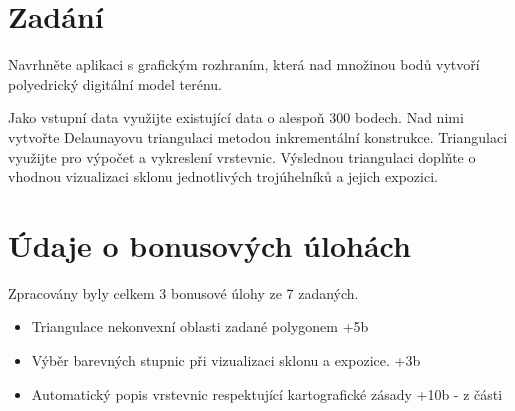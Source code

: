 \documentclass[11pt]{article}
\begin{document}



\tableofcontents

\clearpage


\section{Zadání}
Navrhněte aplikaci s grafickým rozhraním, která nad množinou bodů vytvoří polyedrický digitální model terénu.

Jako vstupní data využijte existující data o alespoň 300 bodech. Nad nimi vytvořte Delaunayovu triangulaci metodou inkrementální konstrukce. Triangulaci využijte pro výpočet a vykreslení vrstevnic. Výslednou triangulaci doplňte o vhodnou vizualizaci sklonu jednotlivých trojúhelníků a jejich expozici. 


\section{Údaje o bonusových úlohách}
Zpracovány byly celkem 3 bonusové úlohy ze 7 zadaných.

\begin{itemize}
	\item Triangulace nekonvexní oblasti zadané polygonem +5b
	\item Výběr barevných stupnic při vizualizaci sklonu a expozice. +3b
	\item Automatický popis vrstevnic respektující kartografické zásady +10b - z části
	
\end{itemize}

\end{document}

